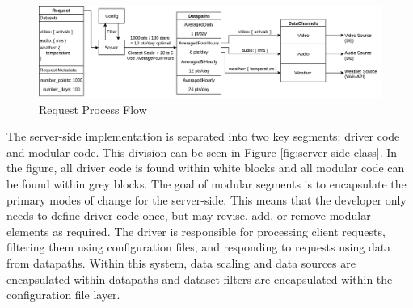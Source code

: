  \begin{figure}
   \centering
   \includegraphics[width=6in]{images/DatapathDataChannelExample.jpg}
   \caption{Request Process Flow}
   \label{fig:server-side-request}
 \end{figure}
The server-side implementation is separated into two key segments: driver code and modular code.  This division can be seen in Figure \ref{fig:server-side-class}.  In the figure, all driver code is found within white blocks and all modular code can be found within grey blocks.  The goal of modular segments is to encapsulate the primary modes of change for the server-side.  This means that the developer only needs to define driver code once, but may revise, add, or remove modular elements as required. The driver is responsible for processing client requests, filtering them using configuration files, and responding to requests using data from datapaths.  Within this system, data scaling and data sources are encapsulated within datapaths and dataset filters are encapsulated within the configuration file layer. \par

